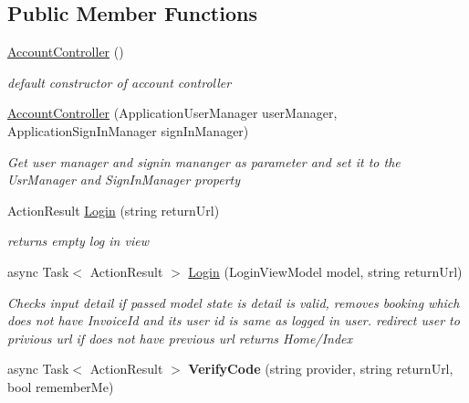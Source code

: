 \subsection*{Public Member Functions}
\begin{DoxyCompactItemize}
\item 
\hyperlink{class_alfa_accounting_1_1_controllers_1_1_account_controller_a31bb8afad3df5a35af60d598886942d2}{Account\+Controller} ()
\begin{DoxyCompactList}\small\item\em default constructor of account controller \end{DoxyCompactList}\item 
\hyperlink{class_alfa_accounting_1_1_controllers_1_1_account_controller_adff8966cf2dd3222d2198cce217cedd5}{Account\+Controller} (Application\+User\+Manager user\+Manager, Application\+Sign\+In\+Manager sign\+In\+Manager)
\begin{DoxyCompactList}\small\item\em Get user manager and signin mananger as parameter and set it to the Usr\+Manager and Sign\+In\+Manager property \end{DoxyCompactList}\item 
Action\+Result \hyperlink{class_alfa_accounting_1_1_controllers_1_1_account_controller_a56dad7128774d78fc1679f133f9dacaa}{Login} (string return\+Url)
\begin{DoxyCompactList}\small\item\em returns empty log in view \end{DoxyCompactList}\item 
async Task$<$ Action\+Result $>$ \hyperlink{class_alfa_accounting_1_1_controllers_1_1_account_controller_af11c863e7062228c7f066a01772b6c5c}{Login} (Login\+View\+Model model, string return\+Url)
\begin{DoxyCompactList}\small\item\em Checks input detail if passed model state is detail is valid, removes booking which does not have Invoice\+Id and its user id is same as logged in user. redirect user to privious url if does not have previous url returns Home/\+Index \end{DoxyCompactList}\item 
\mbox{\label{class_alfa_accounting_1_1_controllers_1_1_account_controller_aa7efed3ed876dcfa29c031345b193727}} 
async Task$<$ Action\+Result $>$ {\bfseries Verify\+Code} (string provider, string return\+Url, bool remember\+Me)

\end{DoxyCompactItemize}
